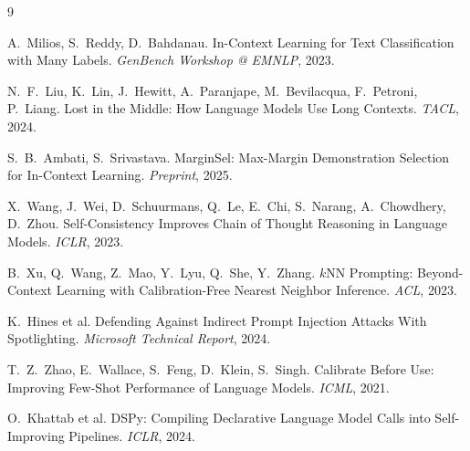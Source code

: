 \documentclass[10pt,twocolumn,letterpaper]{article}
\begin{document}
\begin{thebibliography}{9}
\small\setlength{\itemsep}{1pt}

A.~Milios, S.~Reddy, D.~Bahdanau.
In-Context Learning for Text Classification with Many Labels.
\emph{GenBench Workshop @ EMNLP}, 2023.

N.~F.~Liu, K.~Lin, J.~Hewitt, A.~Paranjape, M.~Bevilacqua,
F.~Petroni, P.~Liang.
Lost in the Middle: How Language Models Use Long Contexts.
\emph{TACL}, 2024.

S.~B.~Ambati, S.~Srivastava.
MarginSel: Max-Margin Demonstration Selection for In-Context Learning.
\emph{Preprint}, 2025.

X.~Wang, J.~Wei, D.~Schuurmans, Q.~Le, E.~Chi, S.~Narang, A.~Chowdhery,
D.~Zhou.
Self-Consistency Improves Chain of Thought Reasoning in Language Models.
\emph{ICLR}, 2023.

B.~Xu, Q.~Wang, Z.~Mao, Y.~Lyu, Q.~She, Y.~Zhang.
$k$NN Prompting: Beyond-Context Learning with Calibration-Free
Nearest Neighbor Inference.
\emph{ACL}, 2023.

K.~Hines et al.
Defending Against Indirect Prompt Injection Attacks With Spotlighting.
\emph{Microsoft Technical Report}, 2024.

T.~Z.~Zhao, E.~Wallace, S.~Feng, D.~Klein, S.~Singh.
Calibrate Before Use: Improving Few-Shot Performance of Language Models.
\emph{ICML}, 2021.

O.~Khattab et al.
DSPy: Compiling Declarative Language Model Calls into Self-Improving
Pipelines.
\emph{ICLR}, 2024.

\end{thebibliography}
\end{document}
